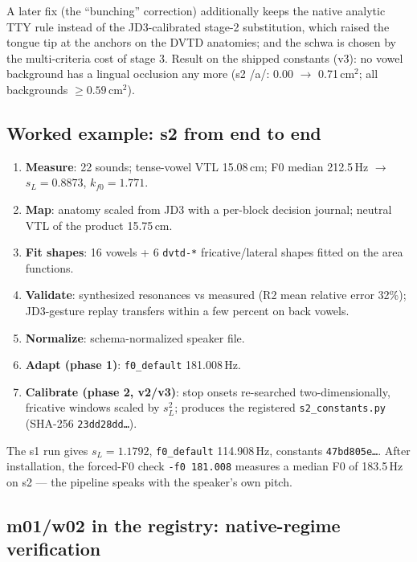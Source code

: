 \documentclass[11pt,a4paper]{article}
\newcommand{\code}[1]{\texttt{#1}}
\begin{document}
A later fix (the ``bunching'' correction) additionally keeps the
native analytic TTY rule instead of the JD3-calibrated stage-2
substitution, which raised the tongue tip at the anchors on the DVTD
anatomies; and the schwa is chosen by the multi-criteria cost of
stage 3. Result on the shipped constants (v3): no vowel background
has a lingual occlusion any more (s2 /a/: 0.00 $\to$ 0.71\,cm$^2$;
all backgrounds $\ge 0.59$\,cm$^2$).

\subsection{Worked example: s2 from end to end}

\begin{enumerate}[leftmargin=1.8em]
\item \textbf{Measure}: 22 sounds; tense-vowel VTL 15.08\,cm; F0
      median 212.5\,Hz $\to$ $s_L = 0.8873$, $k_{f0} = 1.771$.
\item \textbf{Map}: anatomy scaled from JD3 with a per-block
      decision journal; neutral VTL of the product 15.75\,cm.
\item \textbf{Fit shapes}: 16 vowels + 6 \code{dvtd-*}
      fricative/lateral shapes fitted on the area functions.
\item \textbf{Validate}: synthesized resonances vs measured
      (R2 mean relative error 32\%); JD3-gesture replay transfers
      within a few percent on back vowels.
\item \textbf{Normalize}: schema-normalized speaker file.
\item \textbf{Adapt (phase 1)}: \texttt{f0\_default} 181.008\,Hz.
\item \textbf{Calibrate (phase 2, v2/v3)}: stop onsets re-searched
      two-dimensionally, fricative windows scaled by $s_L^2$;
      produces the registered \code{s2\_constants.py}
      (SHA-256 \code{23dd28dd\ldots}).
\end{enumerate}

The s1 run gives $s_L = 1.1792$, \texttt{f0\_default} 114.908\,Hz,
constants \code{47bd805e\ldots}. After installation, the forced-F0
check \texttt{-f0 181.008} measures a median F0 of 183.5\,Hz on s2
--- the pipeline speaks with the speaker's own pitch.

\subsection{m01/w02 in the registry: native-regime verification}
\end{document}
